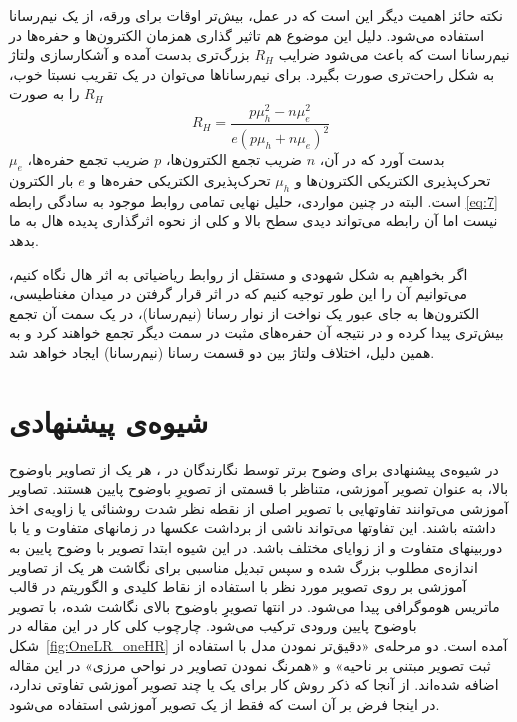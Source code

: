 \documentclass[conference]{IEEEtran-ModifiedForMVIP}
\newcommand{\fused}{آمیخته}
\begin{document}
نکته حائز اهمیت دیگر این است که  در عمل، بیش‌تر اوقات برای ورقه، از یک نیم‌رسانا استفاده می‌شود. دلیل این موضوع هم تاثیر گذاری همزمان الکترون‌ها و حفره‌ها در نیم‌رسانا است که باعث می‌شود ضرایب $R_H$ بزرگ‌تری بدست آمده و آشکارسازی ولتاژ به شکل راحت‌تری صورت بگیرد. برای نیم‌رسانا‌ها می‌توان در یک تقریب نسبتا خوب، $R_H$ را به صورت
\begin{equation}
	R_H = \frac{p \mu_h^2 - n \mu_e^2}{e(p\mu_h + n \mu_e)^2}
\end{equation}
بدست آورد که در آن، $n$ ضریب تجمع الکترون‌ها، $p$ ضریب تجمع حفره‌ها، $\mu_e$ تحرک‌پذیری الکتریکی الکترون‌ها و $\mu_h$ تحرک‌پذیری الکتریکی حفره‌ها و $e$ بار الکترون است. البته در چنین مواردی، حلیل نهایی تمامی روابط موجود به سادگی رابطه \eqref{eq:7} نیست اما آن رابطه می‌تواند دیدی سطح بالا و کلی از نحوه اثرگذاری پدیده هال به ما بدهد.
\cite{noauthor_hall_2021}


اگر بخواهیم به شکل  شهودی و مستقل از روابط ریاضیاتی به اثر هال نگاه کنیم، می‌توانیم آن را این طور توجیه کنیم که در اثر قرار گرفتن در میدان مغناطیسی، الکترون‌ها به جای عبور یک نواخت از نوار رسانا (نیم‌رسانا)، در یک سمت آن تجمع بیش‌تری پیدا کرده و در نتیجه آن حفره‌های مثبت در سمت دیگر تجمع خواهند کرد و به همین دلیل، اختلاف ولتاژ بین دو قسمت رسانا (نیم‌رسانا) ایجاد خواهد شد.


\section{شیوه‌ی پیشنهادی}\label{Sec:TheProposedMethod}
 در شیوه‌ی پیشنهادی برای وضوح برتر توسط نگارندگان در \cite{Amintoosi08reconstruction}، هر یک از تصاویر باوضوح بالا، به عنوان تصویر آموزشی، متناظر با قسمتی از تصویرِ باوضوح پایین هستند.  تصاویر آموزشی می‌توانند تفاوتهایی با تصویر اصلی از نقطه نظر شدت روشنائی یا زاویه‌ی اخذ داشته باشند. 
 این تفاوتها می‌تواند ناشی از برداشت عکسها در زمانهای متفاوت و یا با دوربینهای متفاوت و از زوایای مختلف باشد. در این شیوه ابتدا تصویر با وضوح پایین به اندازه‌ی مطلوب بزرگ شده و سپس  تبدیل مناسبی برای نگاشت هر یک از تصاویر آموزشی بر روی تصویر مورد نظر با استفاده از  نقاط کلیدی  و الگوریتم  در قالب ماتریس هوموگرافی
 پیدا می‌شود. در انتها تصویرِِ باوضوح بالای نگاشت شده، با تصویر باوضوح پایین ورودی
ترکیب می‌شود.
 چارچوب کلی کار در این مقاله در شکل~\ref{fig:OneLR_oneHR} آمده است. دو مرحله‌ی «دقیق‌تر نمودن مدل با استفاده از ثبت تصویر مبتنی بر ناحیه» و «همرنگ نمودن تصاویر در نواحی مرزی» در این مقاله اضافه شده‌اند. از آنجا که ذکر روش کار برای یک یا چند تصویر آموزشی تفاوتی ندارد، در اینجا فرض بر آن است که فقط از یک تصویر آموزشی استفاده می‌شود.
\end{document}

